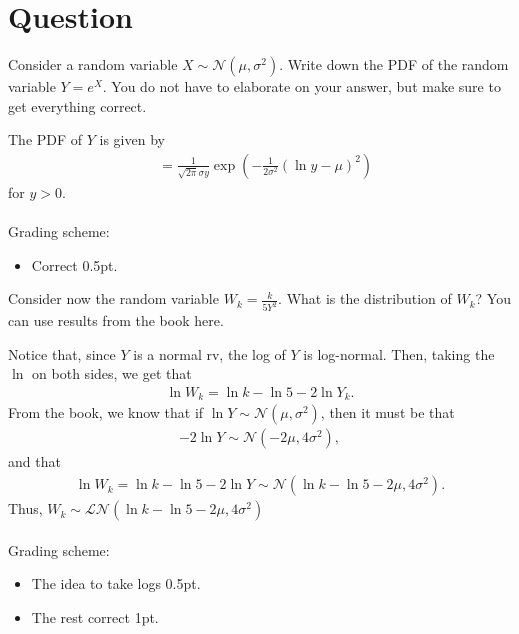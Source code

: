 \section*{Question}

\begin{exercise}[0.5]
Consider a random variable $X\sim\mathcal{N}(\mu,\sigma^2)$. Write down the PDF of the random variable $Y=e^X$. You do not have to elaborate on your answer, but make sure to get everything correct.
\begin{solution}
The PDF of $Y$ is given by
\begin{align*}
    &= \frac{1}{\sqrt{2\pi}\sigma y}\exp{\left(-\frac{1}{2\sigma^2}(\ln{y}-\mu)^2\right)}
\end{align*}
for $y>0$.
\\\\
Grading scheme:
\begin{itemize}
    \item Correct 0.5pt.
\end{itemize}
\end{solution}
\end{exercise}

\begin{exercise}[1.5]
Consider now the random variable $W_k = \frac{k}{5Y^2}$. What is the distribution of $W_k$? You can use results from the book here.
\begin{solution}
Notice that, since $Y$ is a normal rv, the log of $Y$ is log-normal. Then, taking the $\ln$ on both sides, we get that
\begin{align*}
    \ln{W_k} = \ln{k}-\ln{5}-2\ln{Y_k}.
\end{align*}
From the book, we know that if $\ln{Y}\sim\mathcal{N}(\mu,\sigma^2)$, then it must be that
\begin{align*}
    -2\ln{Y}\sim\mathcal{N}(-2\mu, 4\sigma^2),
\end{align*}
and that
\begin{align*}
    \ln{W_k} = \ln{k}-\ln{5}-2\ln{Y}\sim\mathcal{N}(\ln{k}-\ln{5}-2\mu, 4\sigma^2).
\end{align*}
Thus, $W_k\sim\mathcal{L}\mathcal{N}(\ln{k}-\ln{5}-2\mu, 4\sigma^2)$
\\\\
Grading scheme:
\begin{itemize}
    \item The idea to take logs 0.5pt.
    \item The rest correct 1pt.
\end{itemize}
\end{solution}
\end{exercise}


